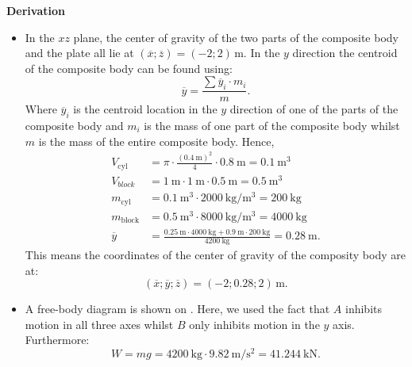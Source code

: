\documentclass[a4paper]{article}
\numberwithin{equation}{problem}
\newcommand{\AUheading}[1]{%
  \par\vspace{.4\baselineskip}%
  {\sffamily\bfseries\color{AUblueDark}#1\par}%
  \nobreak%
}
\newenvironment{derivation}[1][Derivation]{%
  \AUheading{#1}
  \begingroup\allowdisplaybreaks
  \setlength{\abovedisplayskip}{6pt}%
  \setlength{\belowdisplayskip}{6pt}%
  \setlength{\abovedisplayshortskip}{4pt}%
  \setlength{\belowdisplayshortskip}{4pt}%
}{\par\endgroup\medskip}
\begin{document}
    \begin{derivation}
      \begin{itemize}
        \item[Q1.1] In the $xz$ plane, the center of gravity of the two parts of the composite body and the plate all lie at $(\overline{x};\overline{z}) = (-2; 2) \, \unit{\m}$. In the $y$ direction the centroid of the composite body can be found using:
          \begin{equation*}
            \overline{y} = \frac{\sum \overline{y}_i \cdot m_i}{m}
          .\end{equation*}
          Where $\overline{y}_i$ is the centroid location in the $y$ direction of one of the parts of the composite body and $m_i$ is the mass of one part of the composite body whilst $m$ is the mass of the entire composite body.
          Hence,
          \begin{align*}
            V_{\mathrm{cyl}} &= \pi \cdot \frac{\left( \qty{0.4}{\m}  \right)^2}{4} \cdot \qty{0.8}{\m}  = \qty{0,1}{\m^3}  \\
            V_{block} &= \qty{1}{\m} \cdot \qty{1}{\m} \cdot \qty{0,5}{\m} = \qty{0,5}{\m^3}  \\
            m_{\mathrm{cyl}} &= \qty{0,1}{\m^3} \cdot \qty{2000}{\kg\per\m^3} = \qty{200}{\kg}  \\
            m_{\mathrm{block}} &= \qty{0,5}{\m^3} \cdot \qty{8000}{\kg\per\m^3} = \qty{4000}{\kg}   \\
            \overline{y} &= \frac{\qty{0.25}{\m} \cdot \qty{4000}{\kg} + \qty{0,9}{\m} \cdot \qty{200}{\kg} }{\qty{4200}{\kg} } = \qty{0,28}{\m}
          .\end{align*}
          This means the coordinates of the center of gravity of the composity body are at:
          \begin{equation*}
            \left( \overline{x}; \overline{y}; \overline{z} \right) = (-2; \num{0,28}; 2)\, \unit{\m}
          .\end{equation*}
        \item[Q1.2] A free-body diagram is shown on . Here, we used the fact that $A$ inhibits motion in all three axes whilst $B$ only inhibits motion in the $y$ axis.
          Furthermore:
          \begin{equation*}
            W = mg = \qty{4200}{\kg} \cdot \qty{9,82}{\m\per\s^2} = \qty{41,244}{\kN}  
          .\end{equation*}
          

\end{itemize}
\end{derivation}
\end{document}
